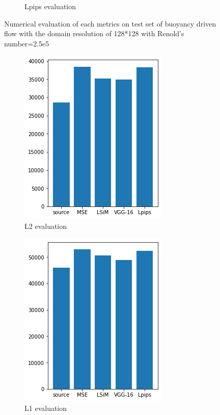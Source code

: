 \documentclass[a4paper,12pt,twoside]{report}
\begin{document}
\begin{figure}
\begin{subfigure}{0.32\textwidth}
		\caption{Lpips evaluation}
	\end{subfigure}
	\caption{Numerical evaluation of each metrics on test set of buoyancy driven flow with the domain resolution of 128*128 with Renold's number=2.5e5}
	\label{sol buoyancy high numeval}
		\end{figure}
	
	
	
	
	\begin{figure}
		\centering
		\begin{subfigure}{0.32\textwidth}
			\centering
			\includegraphics[scale=0.49]{buoyancy_low/l2.png}
			\caption{L2 evaluation}
		\end{subfigure}
		\begin{subfigure}{0.32\textwidth}
			\centering
			\includegraphics[scale=0.49]{buoyancy_low/l1.png}
			\caption{L1 evaluation}
		\end{subfigure}
		\begin{subfigure}{0.32\textwidth}

\end{subfigure}
\end{figure}
\end{document}
